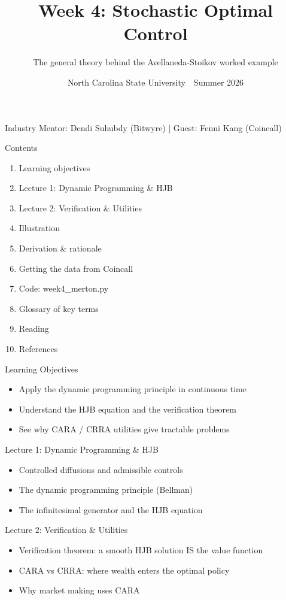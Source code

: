 \documentclass[aspectratio=169,10pt]{beamer}
\title{Week 4: Stochastic Optimal Control}
\subtitle{The general theory behind the Avellaneda-Stoikov worked example}
\date{North Carolina State University \,\textbar\, Summer 2026}
\begin{document}
\begin{frame}[plain]\titlepage\begin{center}\tiny Industry Mentor: Dendi Suhubdy (Bitwyre)  |  Guest: Fenni Kang (Coincall)\end{center}\end{frame}
\begin{frame}{Contents}
\small\begin{enumerate}\setlength{\itemsep}{3pt}
  \item Learning objectives
  \item Lecture 1: Dynamic Programming \& HJB
  \item Lecture 2: Verification \& Utilities
  \item Illustration
  \item Derivation \& rationale
  \item Getting the data from Coincall
  \item Code: week4\_merton.py
  \item Glossary of key terms
  \item Reading
  \item References
\end{enumerate}
\end{frame}

\begin{frame}{Learning Objectives}
\begin{itemize}
  \item Apply the dynamic programming principle in continuous time
  \item Understand the HJB equation and the verification theorem
  \item See why CARA / CRRA utilities give tractable problems
\end{itemize}
\end{frame}

\begin{frame}{Lecture 1: Dynamic Programming \& HJB}
\begin{itemize}
  \item Controlled diffusions and admissible controls
  \item The dynamic programming principle (Bellman)
  \item The infinitesimal generator and the HJB equation
\end{itemize}
\end{frame}

\begin{frame}{Lecture 2: Verification \& Utilities}
\begin{itemize}
  \item Verification theorem: a smooth HJB solution IS the value function
  \item CARA vs CRRA: where wealth enters the optimal policy
  \item Why market making uses CARA
\end{itemize}
\end{frame}
\end{document}
